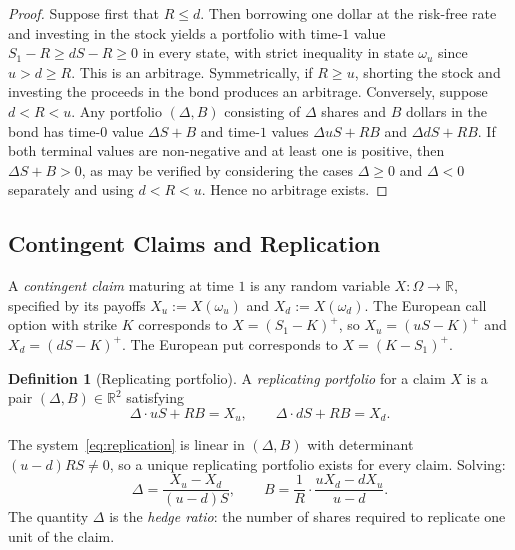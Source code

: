 \documentclass[11pt,a4paper]{article}
\theoremstyle{plain}
\theoremstyle{definition}
\newtheorem{definition}[theorem]{Definition}
\newcommand{\R}{\mathbb{R}}
\begin{document}
\begin{proof}
Suppose first that $R \leq d$. Then borrowing one dollar at the risk-free
rate and investing in the stock yields a portfolio with time-$1$ value
$S_1 - R \geq dS - R \geq 0$ in every state, with strict inequality in
state $\omega_u$ since $u > d \geq R$. This is an arbitrage. Symmetrically,
if $R \geq u$, shorting the stock and investing the proceeds in the bond
produces an arbitrage. Conversely, suppose $d < R < u$. Any portfolio
$(\Delta, B)$ consisting of $\Delta$ shares and $B$ dollars in the bond
has time-$0$ value $\Delta S + B$ and time-$1$ values
$\Delta u S + RB$ and $\Delta d S + RB$. If both terminal values are
non-negative and at least one is positive, then $\Delta S + B > 0$,
as may be verified by considering the cases $\Delta \geq 0$ and $\Delta < 0$
separately and using $d < R < u$. Hence no arbitrage exists.
\end{proof}

\subsection{Contingent Claims and Replication}
\label{subsec:contingent}

A \emph{contingent claim} maturing at time $1$ is any random variable
$X : \Omega \to \R$, specified by its payoffs $X_u := X(\omega_u)$ and
$X_d := X(\omega_d)$. The European call option with strike $K$ corresponds
to $X = (S_1 - K)^+$, so $X_u = (uS - K)^+$ and $X_d = (dS - K)^+$.
The European put corresponds to $X = (K - S_1)^+$.

\begin{definition}[Replicating portfolio]
\label{def:replicating}
A \emph{replicating portfolio} for a claim $X$ is a pair $(\Delta, B) \in
\R^2$ satisfying
\begin{equation}
    \label{eq:replication}
    \Delta \cdot uS + RB = X_u, \qquad \Delta \cdot dS + RB = X_d.
\end{equation}
\end{definition}

The system~\eqref{eq:replication} is linear in $(\Delta, B)$ with
determinant $(u-d)RS \neq 0$, so a unique replicating portfolio exists for
every claim. Solving:
\begin{equation}
    \label{eq:delta-B}
    \Delta = \frac{X_u - X_d}{(u-d)S}, \qquad
    B = \frac{1}{R} \cdot \frac{u X_d - d X_u}{u - d}.
\end{equation}
The quantity $\Delta$ is the \emph{hedge ratio}: the number of shares
required to replicate one unit of the claim.
\end{document}
